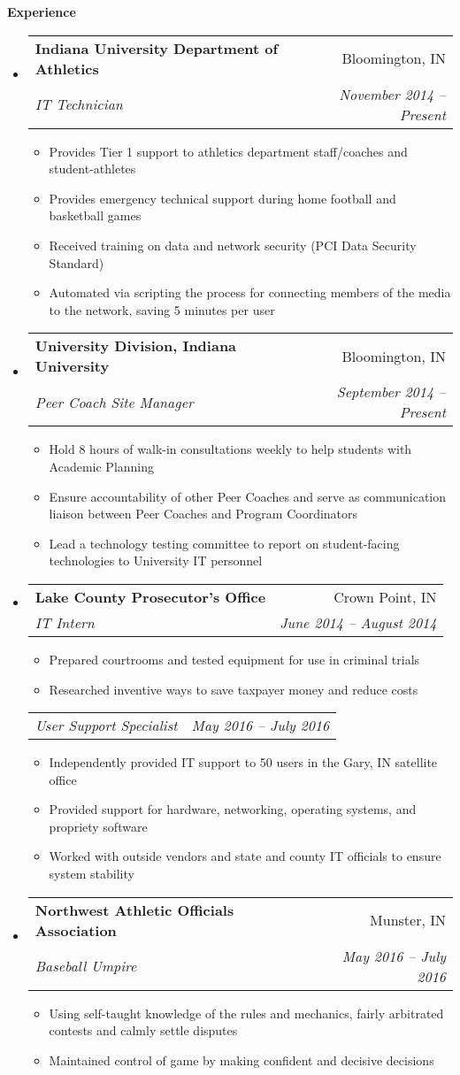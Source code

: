 \documentclass[letterpaper,11pt]{article}
\makeatletter
\newcommand{\resitem}[1]{\item #1 \vspace{-2pt}}
\newcommand{\resheading}[1]{{\large \colorbox{mygrey}{\begin{minipage}{\textwidth}{\textbf{#1 \vphantom{p\^{E}}}}\end{minipage}}}}
\newcommand{\ressubheading}[4]{
    \begin{tabular*}{6.5in}{l@{\extracolsep{\fill}}r}
      \textbf{#1} & #2 \\
      \textit{#3} & \textit{#4} \\
  \end{tabular*}\vspace{-6pt}}
\newcommand{\ressubsubheading}[2]{
    \begin{tabular*}{6.5in}{l@{\extracolsep{\fill}}r}
      \textit{#1} & \textit{#2} \\
  \end{tabular*}\vspace{-6pt}}
\makeatother
\begin{document}
  \resheading{Experience}
  \begin{itemize}
    \item %
      \ressubheading{Indiana University Department of Athletics}{Bloomington, IN}
      {IT Technician}{November 2014 -- Present}
      { \footnotesize
	\begin{itemize}
	    \resitem{Provides Tier 1 support to athletics department staff/coaches and student-athletes}
	    \resitem{Provides emergency technical support during home football and basketball games}
	    \resitem{Received training on data and network security (PCI Data Security Standard)}
	    \resitem{Automated via scripting the process for connecting members of the media to the network, saving 5 minutes per user}
	\end{itemize}
      }

    \item 
      \ressubheading{University Division, Indiana University}{Bloomington, IN}{Peer Coach Site Manager}{September 2014 -- Present}
      { \footnotesize
	\begin{itemize}
	    \resitem{Hold 8 hours of walk-in consultations weekly to help students with Academic Planning}
	    \resitem{Ensure accountability of other Peer Coaches and serve as communication liaison between Peer Coaches and Program Coordinators}
	    \resitem{Lead a technology testing committee to report on student-facing technologies to University IT personnel}
	\end{itemize}
      }

    \item
      \ressubheading{Lake County Prosecutor's Office}{Crown Point, IN}
      {IT Intern}{June 2014 -- August 2014}
      { \footnotesize
	\begin{itemize}
	    \resitem{Prepared courtrooms and tested equipment for use in criminal trials}
	    \resitem{Researched inventive ways to save taxpayer money and reduce costs}
	\end{itemize}
      }
      \ressubsubheading{User Support Specialist}{May 2016 -- July 2016}
      { \footnotesize
      \begin{itemize}
	  \resitem{Independently provided IT support to 50 users in the Gary, IN satellite office}
	  \resitem{Provided support for hardware, networking, operating systems, and propriety software}
   	  \resitem{Worked with outside vendors and state and county IT officials to ensure system stability}
    \end{itemize} }
    \item
      \ressubheading{Northwest Athletic Officials Association}{Munster, IN}
      	{Baseball Umpire}{May 2016 -- July 2016}
	{\footnotesize
	  \begin{itemize}
	      \resitem{Using self-taught knowledge of the rules and mechanics, fairly arbitrated contests and calmly settle disputes}
	      \resitem{Maintained control of game by making confident and decisive decisions}
	  \end{itemize}
      }
  
	    
  \end{itemize}  %
\end{document}
